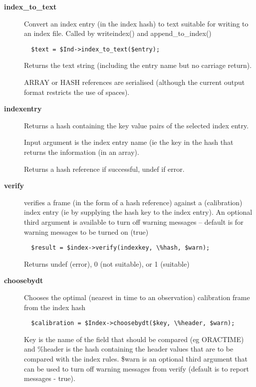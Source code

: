 \begin{description}
\begin{description}
\item[{\textbf{index\_to\_text}}] \mbox{}

Convert an index entry (in the index hash) to text suitable for
writing to an index file. Called by writeindex() and append\_to\_index()

\begin{verbatim}
  $text = $Ind->index_to_text($entry);
\end{verbatim}


Returns the text string (including the entry name but no carriage
return).



ARRAY or HASH references are serialised (although the current output
format restricts the use of spaces).


\item[{\textbf{indexentry}}] \mbox{}

Returns a hash containing the key value pairs of the
selected index entry.



Input argument is the index entry name (ie the key in the hash
that returns the information (in an array).



Returns a hash reference if successful, undef if error.


\item[{\textbf{verify}}] \mbox{}

verifies a frame (in the form of a hash reference) against a
(calibration) index entry (ie by supplying the hash key to the index
entry). An optional third argument is available to turn off warning
messages -- default is for warning messages to be turned on (true)

\begin{verbatim}
  $result = $index->verify(indexkey, \%hash, $warn);
\end{verbatim}


Returns undef (error), 0 (not suitable), or 1 (suitable)


\item[{\textbf{choosebydt}}] \mbox{}

Chooses the optimal (nearest in time to an observation) calibration
frame from the index hash

\begin{verbatim}
  $calibration = $Index->choosebydt($key, \%header, $warn);
\end{verbatim}


Key is the name of the field that should be compared (eg ORACTIME)
and \%header is the hash containing the header values that are to
be compared with the index rules. \$warn is an optional third argument
that can be used to turn off warning messages from verify (default
is to report messages - true).




\end{description}
\end{description}
